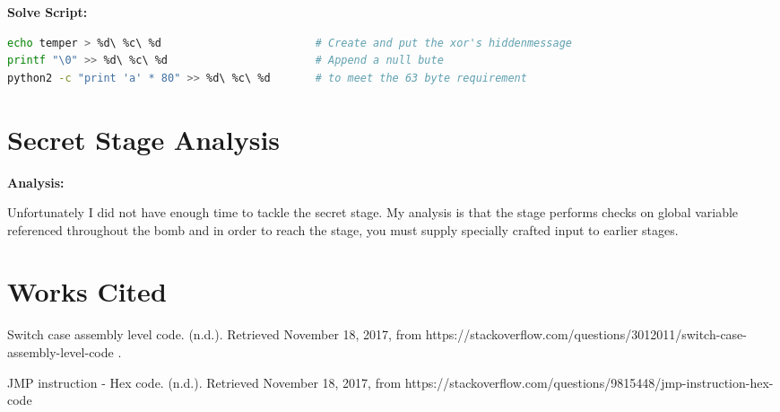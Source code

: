 \documentclass{article}
\begin{document}
\begin{flushleft}
\textbf{Solve Script:}
\vspace{.5pc}
\end{flushleft}
\par

\begin{lstlisting}[language=Bash]
echo temper > %d\ %c\ %d                        # Create and put the xor's hiddenmessage
printf "\0" >> %d\ %c\ %d                       # Append a null bute
python2 -c "print 'a' * 80" >> %d\ %c\ %d       # to meet the 63 byte requirement
\end{lstlisting}

\newpage
\section{Secret Stage Analysis}
\begin{flushleft}
\vspace{.5pc}
\end{flushleft}

\begin{flushleft}
\textbf{Analysis:}
\vspace{.5pc}
\end{flushleft}
\par
Unfortunately I did not have enough time to tackle the secret stage.  My 
analysis is that the stage performs checks on global variable referenced 
throughout the bomb and in order to reach the stage, you must supply specially 
crafted input to earlier stages.


\newpage
\section{Works Cited}
\begin{thebibliography}{9}
Switch case assembly level code. (n.d.). Retrieved November 18, 2017, from https://stackoverflow.com/questions/3012011/switch-case-assembly-level-code
.
 
JMP instruction - Hex code. (n.d.). Retrieved November 18, 2017, from https://stackoverflow.com/questions/9815448/jmp-instruction-hex-code
 
\end{thebibliography}
\end{document}
